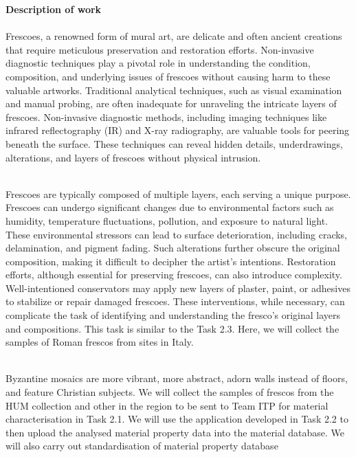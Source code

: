 \textbf{Description of work}\\
\\
Frescoes, a renowned form of mural art, are delicate and often ancient creations that require meticulous preservation and restoration efforts. Non-invasive diagnostic techniques play a pivotal role in understanding the condition, composition, and underlying issues of frescoes without causing harm to these valuable artworks. Traditional analytical techniques, such as visual examination and manual probing, are often inadequate for unraveling the intricate layers of frescoes. Non-invasive diagnostic methods, including imaging techniques like infrared reflectography (IR) and X-ray radiography, are valuable tools for peering beneath the surface. These techniques can reveal hidden details, underdrawings, alterations, and layers of frescoes without physical intrusion.

\\
Frescoes are typically composed of multiple layers, each serving a unique purpose. Frescoes can undergo significant changes due to environmental factors such as humidity, temperature fluctuations, pollution, and exposure to natural light. These environmental stressors can lead to surface deterioration, including cracks, delamination, and pigment fading. Such alterations further obscure the original composition, making it difficult to decipher the artist’s intentions. Restoration efforts, although essential for preserving frescoes, can also introduce complexity. Well-intentioned conservators may apply new layers of plaster, paint, or adhesives to stabilize or repair damaged frescoes. These interventions, while necessary, can complicate the task of identifying and understanding the fresco’s original layers and compositions. This task is similar to the Task 2.3. Here, we will collect the samples of Roman frescos from sites in Italy.

\\
Byzantine mosaics are more vibrant, more abstract, adorn walls instead of floors, and feature Christian subjects. We will collect the samples of frescos from the HUM collection and other in the region to be sent to Team ITP for material characterisation in Task 2.1. We will use the application developed in Task 2.2 to then upload the analysed material property data into the material database. We will also carry out standardisation of material property database

